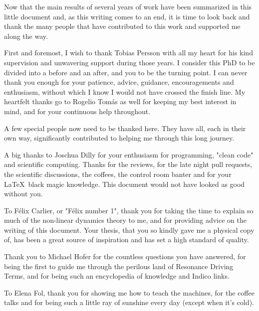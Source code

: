 \begin{acknowledgements}
\vspace{0.8cm}

Now that the main results of several years of work have been summarized in this little document and, as this writing comes to an end, it is time to look back and thank the many people that have contributed to this work and supported me along the way.
\newline

First and foremost, I wish to thank Tobias Persson with all my heart for his kind supervision and unwavering support during those years.
I consider this PhD to be divided into a before and an after, and you to be the turning point.
I can never thank you enough for your patience, advice, guidance, encouragements and enthusiasm, without which I know I would not have crossed the finish line.
My heartfelt thanks go to Rogelio Tomás as well for keeping my best interest in mind, and for your continuous help throughout.
\newline

A few special people now need to be thanked here.
They have all, each in their own way, significantly contributed to helping me through this long journey.
\newline

A big thanks to Joschua Dilly for your enthusiasm for programming, "clean code" and scientific computing.
Thanks for the reviews, for the late night pull requests, the scientific discussions, the coffees, the control room banter and for your \LaTeX \ black magic knowledge.
This document would not have looked as good without you.

To Félix Carlier, or "Félix number \num{1}", thank you for taking the time to explain so much of the non-linear dynamics theory to me, and for providing advice on the writing of this document.
Your thesis, that you so kindly gave me a physical copy of, has been a great source of inspiration and has set a high standard of quality.

Thank you to Michael Hofer for the countless questions you have answered, for being the first to guide me through the perilous land of Resonance Driving Terms, and for being such an encyclopedia of knowledge and Indico links.

To Elena Fol, thank you for showing me how to teach the machines, for the coffee talks and for being such a little ray of sunshine every day (except when it's cold).


\end{acknowledgements}
